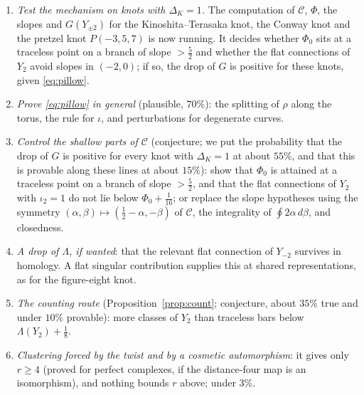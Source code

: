 \documentclass[10pt]{amsart}
\numberwithin{equation}{section}
\theoremstyle{compact}
\theoremstyle{definition}
\newcommand{\cC}{\mathcal C}
\begin{document}
\begin{enumerate}
\item \emph{Test the mechanism on knots with $\Delta_K=1$.} The computation
of $\cC$, $\Phi$, the slopes and $G(Y_{\pm2})$ for the Kinoshita--Terasaka
knot, the Conway knot and the pretzel knot $P(-3,5,7)$ is now running. It
decides whether $\Phi_0$ sits at a traceless point on a branch of slope
$>\frac52$ and whether the flat connections of $Y_2$ avoid slopes in
$(-2,0)$; if so, the drop of $G$ is positive for these knots, given
\eqref{eq:pillow}.
\item \emph{Prove \eqref{eq:pillow} in general} (plausible, $70\%$): the
splitting of $\rho$ along the torus, the rule for $\iota$, and
perturbations for degenerate curves.
\item \emph{Control the shallow parts of $\cC$} (conjecture; we put the
probability that the drop of $G$ is positive for every knot with
$\Delta_K=1$ at about $55\%$, and that this is provable along these lines at
about $15\%$): show that $\Phi_0$ is attained at a traceless point on a
branch of slope $>\frac52$, and that the flat connections of $Y_2$ with
$\iota_2=1$ do not lie below $\Phi_0+\frac1{16}$; or replace the slope
hypotheses using the symmetry $(\alpha,\beta)\mapsto(\frac12-\alpha,-\beta)$
of $\cC$, the integrality of $\oint2\alpha\,d\beta$, and closedness.
\item \emph{A drop of $\Lambda$, if wanted}: that the relevant flat
connection of $Y_{-2}$ survives in homology. A flat singular contribution
supplies this at shared representations, as for the figure-eight knot.
\item \emph{The counting route} (Proposition~\ref{prop:count}; conjecture,
about $35\%$ true and under $10\%$ provable): more classes of $Y_2$ than
traceless bars below $\Lambda(Y_2)+\frac18$.
\item \emph{Clustering forced by the twist and by a cosmetic automorphism}:
it gives only $r\ge4$ (proved for perfect complexes, if the distance-four
map is an isomorphism), and nothing bounds $r$ above; under $3\%$.
\end{enumerate}
\end{document}
